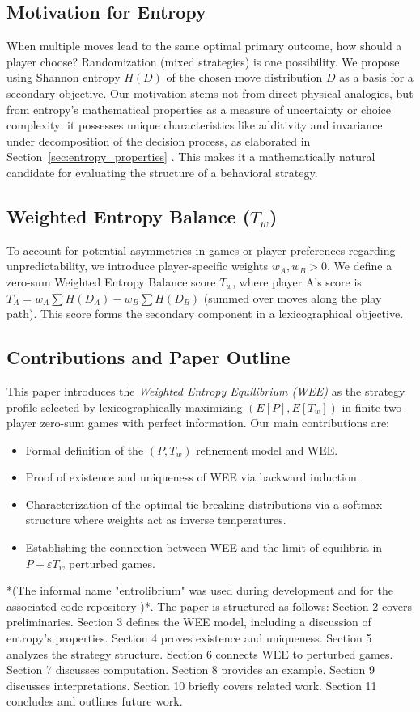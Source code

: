 \documentclass{article}
\begin{document}
\subsection{Motivation for Entropy}
When multiple moves lead to the same optimal primary outcome, how should a player choose? Randomization (mixed strategies) is one possibility. We propose using Shannon entropy $H(D)$ of the chosen move distribution $D$ as a basis for a secondary objective. Our motivation stems not from direct physical analogies, but from entropy's mathematical properties as a measure of uncertainty or choice complexity: it possesses unique characteristics like additivity and invariance under decomposition of the decision process, as elaborated in Section~\ref{sec:entropy_properties} \cite{placeholder_shannon_properties}. This makes it a mathematically natural candidate for evaluating the structure of a behavioral strategy.

\subsection{Weighted Entropy Balance (\texorpdfstring{$T_w$}{Tw})}
To account for potential asymmetries in games or player preferences regarding unpredictability, we introduce player-specific weights $w_A, w_B > 0$. We define a zero-sum Weighted Entropy Balance score $T_w$, where player A's score is $T_A = w_A \sum H(D_A) - w_B \sum H(D_B)$ (summed over moves along the play path). This score forms the secondary component in a lexicographical objective.

\subsection{Contributions and Paper Outline}
This paper introduces the \emph{Weighted Entropy Equilibrium (WEE)} as the strategy profile selected by lexicographically maximizing $(E[P], E[T_w])$ in finite two-player zero-sum games with perfect information. Our main contributions are:
\begin{itemize}
    \item Formal definition of the $(P, T_w)$ refinement model and WEE.
    \item Proof of existence and uniqueness of WEE via backward induction.
    \item Characterization of the optimal tie-breaking distributions via a softmax structure where weights act as inverse temperatures.
    \item Establishing the connection between WEE and the limit of equilibria in $P + \varepsilon T_w$ perturbed games.
\end{itemize}
*(The informal name "entrolibrium" was used during development and for the associated code repository \cite{placeholder_repo})*.
The paper is structured as follows: Section 2 covers preliminaries. Section 3 defines the WEE model, including a discussion of entropy's properties. Section 4 proves existence and uniqueness. Section 5 analyzes the strategy structure. Section 6 connects WEE to perturbed games. Section 7 discusses computation. Section 8 provides an example. Section 9 discusses interpretations. Section 10 briefly covers related work. Section 11 concludes and outlines future work.
\end{document}
